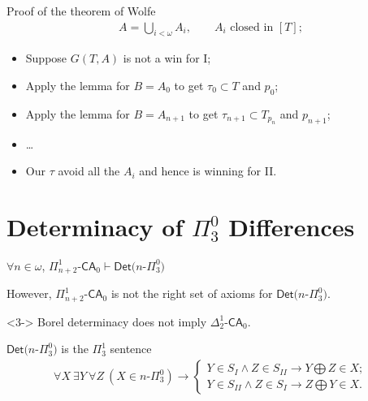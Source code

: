 \documentclass{beamer} %
\begin{document}

\begin{frame}{Proof of the theorem of Wolfe}
    \begin{align*}
        A = \bigcup_{i < \omega} A_i, \qquad A_i \text{ closed in } [T];
    \end{align*}
    \begin{itemize}
        \item<2-> Suppose $G(T,A)$ is not a win for I\@;
        \item<3-> Apply the lemma for $B = A_0$ to get $\tau_0 \subset T$ and $p_0$;
        \item<4-> Apply the lemma for $B = A_{n+1}$ to get $\tau_{n+1} \subset T_{p_{n}}$ and $p_{n+1}$;
        \item<5-> \dots
        \item<6-> Our $\tau$ avoid all the $A_i$ and hence is winning for II\@.
    \end{itemize}
\end{frame}



\section{Determinacy of \texorpdfstring{$\Pi^0_3$}{Pi03} Differences}
\begin{frame}{} 
    \begin{theorem}
        $\forall n \in \omega$, $\Pi^1_{n+2}$-$\mathsf{CA}_0 \vdash \mathsf{Det}(n$-$\Pi^0_3)$
    \end{theorem}
    \pause
    However, $\Pi^1_{n+2}$-$\mathsf{CA}_0$ is not the right set of axioms for 
    $\mathsf{Det}(n$-$\Pi^0_3)$.

    \begin{theorem}<3->
        Borel determinacy does not imply $\Delta^1_2$-$\mathsf{CA}_0$.
    \end{theorem}
    \pause
    \pause
    $\mathsf{Det}(n$-$\Pi^0_3)$ is the $\Pi^1_3$ sentence
    \begin{align*}
        \forall X \ \exists Y \ \forall Z \ (X \in n\text{-}\Pi^0_3) \rightarrow \begin{cases}
            Y \in S_I \land Z \in S_{II} \rightarrow Y \bigoplus Z \in X;
            \\  Y \in S_{II} \land Z \in S_{I} \rightarrow Z \bigoplus Y \in X.
        \end{cases}
    \end{align*}
\end{frame}
\end{document}
